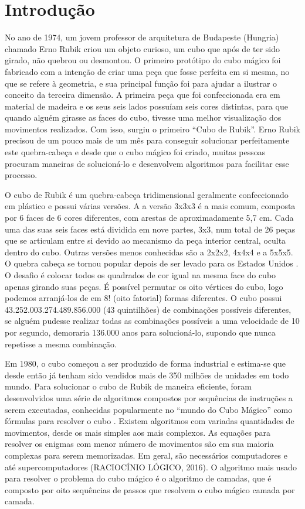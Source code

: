\chapter{Introdução}

No ano de 1974, um jovem professor de arquitetura de Budapeste (Hungria) chamado Erno Rubik criou um objeto curioso, um cubo que após de ter sido girado,  não quebrou ou desmontou.\cite{his} O primeiro protótipo do cubo mágico foi fabricado com a intenção de criar uma peça que fosse perfeita em si mesma, no que se refere à geometria, e sua principal função foi para ajudar a ilustrar o conceito da terceira dimensão. A primeira peça que foi confeccionada era em material de madeira e os seus seis lados possuíam seis cores distintas, para que quando alguém girasse as faces do cubo, tivesse uma melhor visualização dos movimentos realizados. Com isso, surgiu o primeiro “Cubo de Rubik”. Erno Rubik precisou de um pouco mais de um mês para conseguir solucionar perfeitamente este quebra-cabeça e desde que o cubo mágico foi criado, muitas pessoas procuram maneiras de solucioná-lo e desenvolvem algoritmos para facilitar esse processo.\cite{ORI}

    O cubo de Rubik é um quebra-cabeça tridimensional geralmente confeccionado em plástico e possui várias versões. A a versão 3x3x3 é a mais comum, composta por 6 faces de 6 cores diferentes, com arestas de aproximadamente 5,7 cm. Cada uma das suas seis faces está dividida em nove partes, 3x3, num total de 26 peças que se articulam entre si devido ao mecanismo da peça interior central, oculta dentro do cubo.  Outras versões menos conhecidas são a 2x2x2, 4x4x4 e a 5x5x5. O quebra cabeça se tornou popular depois de ser levado para os Estados Unidos \cite{sobre}. O desafio é colocar todos os quadrados de cor igual na mesma face do cubo apenas girando suas peças. É possível permutar os oito vértices do cubo, logo podemos arranjá-los de em 8! (oito fatorial) formas diferentes. O cubo possui 43.252.003.274.489.856.000 (43 quintilhões) de combinações possíveis diferentes, se alguém pudesse realizar todas as combinações possíveis a uma velocidade de 10 por segundo, demoraria 136.000 anos para solucioná-lo, supondo que nunca repetisse a mesma combinação. \cite{invencao}
    
    
     Em 1980, o cubo começou a ser produzido de forma industrial e estima-se que desde então já tenham sido vendidos mais de 350 milhões de unidades em todo mundo.
    Para solucionar o cubo de Rubik de maneira eficiente, foram desenvolvidos uma série de algoritmos compostos por sequências de instruções a serem executadas, conhecidas popularmente no “mundo do Cubo Mágico” como fórmulas para resolver o cubo \cite{movimentos}. Existem algoritmos com variadas quantidades de movimentos, desde os mais simples aos mais complexos. As equações para resolver os enigmas com menor número de movimentos são em sua maioria complexas para serem memorizadas. Em geral, são necessários computadores e até supercomputadores (RACIOCÍNIO LÓGICO, 2016). O algoritmo mais usado para resolver o problema do cubo mágico é o algoritmo de camadas, que é composto por oito sequências de passos que resolvem o cubo mágico camada por camada.

